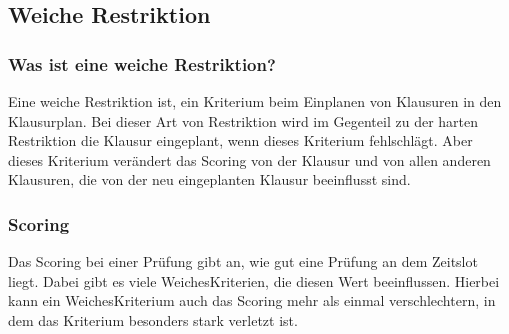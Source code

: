 \subsection{Weiche Restriktion}\label{subsec:weiche_restriktion}

\subsubsection{Was ist eine weiche Restriktion?}
Eine weiche Restriktion ist, ein Kriterium beim Einplanen von Klausuren in den Klausurplan.
Bei dieser Art von Restriktion wird im Gegenteil zu der harten Restriktion die Klausur eingeplant,
wenn dieses Kriterium fehlschlägt.
Aber dieses Kriterium verändert das Scoring von der Klausur und von allen anderen Klausuren, die von
der neu eingeplanten Klausur beeinflusst sind.

\subsubsection{Scoring}
Das Scoring bei einer Prüfung gibt an, wie gut eine Prüfung an dem Zeitslot liegt.
Dabei gibt es viele WeichesKriterien, die diesen Wert beeinflussen.
Hierbei kann ein WeichesKriterium auch das Scoring mehr als einmal verschlechtern, in dem das Kriterium
besonders stark verletzt ist.










